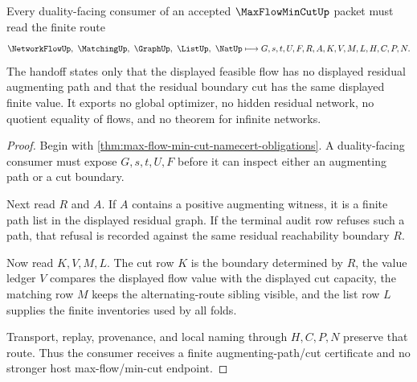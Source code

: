 \begin{theorem}
\label{thm:max-flow-min-cut-augmenting-cut-handoff}
Every duality-facing consumer of an accepted $\MaxFlowMinCutUp$ packet must read the finite route
$$
\NetworkFlowUp,\ \MatchingUp,\ \GraphUp,\ \ListUp,\ \NatUp
\longmapsto
G,s,t,U,F,R,A,K,V,M,L,H,C,P,N .
$$
The handoff states only that the displayed feasible flow has no displayed residual augmenting path and that the residual boundary cut has the same displayed finite value. It exports no global optimizer, no hidden residual network, no quotient equality of flows, and no theorem for infinite networks.
\end{theorem}
\begin{proof}
Begin with \autoref{thm:max-flow-min-cut-namecert-obligations}. A duality-facing consumer must expose $G,s,t,U,F$ before it can inspect either an augmenting path or a cut boundary.

Next read $R$ and $A$. If $A$ contains a positive augmenting witness, it is a finite path list in the displayed residual graph. If the terminal audit row refuses such a path, that refusal is recorded against the same residual reachability boundary $R$.

Now read $K,V,M,L$. The cut row $K$ is the boundary determined by $R$, the value ledger $V$ compares the displayed flow value with the displayed cut capacity, the matching row $M$ keeps the alternating-route sibling visible, and the list row $L$ supplies the finite inventories used by all folds.

Transport, replay, provenance, and local naming through $H,C,P,N$ preserve that route. Thus the consumer receives a finite augmenting-path/cut certificate and no stronger host max-flow/min-cut endpoint.
\end{proof}



